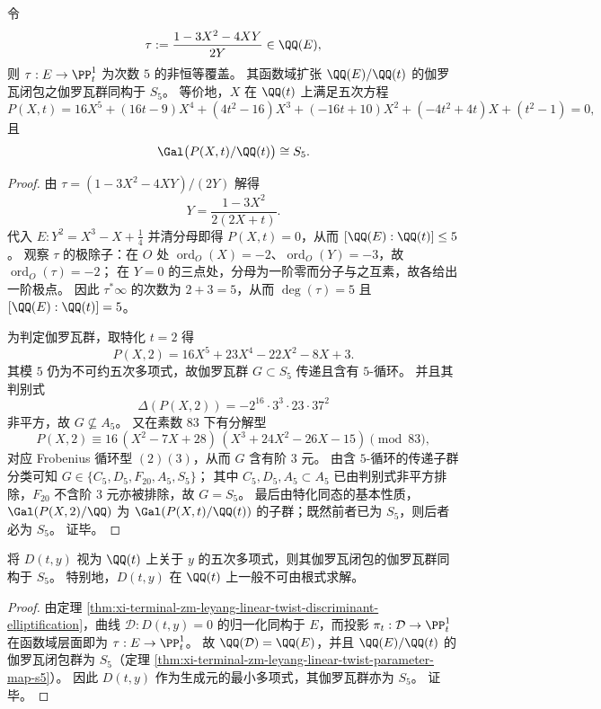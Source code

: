 \begin{theorem}[分歧参数映射的满对称单值化：\texorpdfstring{$\Gal\cong S_5$}{Gal = S5}]\label{thm:xi-terminal-zm-leyang-linear-twist-parameter-map-s5}
令
\[
\tau:=\frac{1-3X^2-4XY}{2Y}\in\QQ(E),
\]
则 \(\tau:E\to\PP^1_t\) 为次数 \(5\) 的非恒等覆盖。
其函数域扩张 \(\QQ(E)/\QQ(t)\) 的伽罗瓦闭包之伽罗瓦群同构于 \(S_5\)。
等价地，\(X\) 在 \(\QQ(t)\) 上满足五次方程
\[
P(X,t)=16X^5+(16t-9)X^4+(4t^2-16)X^3+(-16t+10)X^2+(-4t^2+4t)X+(t^2-1)=0,
\]
且
\[
\Gal\bigl(P(X,t)/\QQ(t)\bigr)\cong S_5.
\]
\end{theorem}
\begin{proof}
由 \(\tau=(1-3X^2-4XY)/(2Y)\) 解得
\[
Y=\frac{1-3X^2}{2(2X+t)}.
\]
代入 \(E:Y^2=X^3-X+\tfrac14\) 并清分母即得 \(P(X,t)=0\)，从而 \([\QQ(E):\QQ(t)]\le 5\)。
观察 \(\tau\) 的极除子：在 \(O\) 处 \(\operatorname{ord}_O(X)=-2\)、\(\operatorname{ord}_O(Y)=-3\)，故 \(\operatorname{ord}_O(\tau)=-2\)；
在 \(Y=0\) 的三点处，分母为一阶零而分子与之互素，故各给出一阶极点。
因此 \(\tau^*\infty\) 的次数为 \(2+3=5\)，从而 \(\deg(\tau)=5\) 且 \([\QQ(E):\QQ(t)]=5\)。
\par
为判定伽罗瓦群，取特化 \(t=2\) 得
\[
P(X,2)=16X^5+23X^4-22X^2-8X+3.
\]
其模 \(5\) 仍为不可约五次多项式，故伽罗瓦群 \(G\subset S_5\) 传递且含有 \(5\)-循环。
并且其判别式
\[
\Delta(P(X,2))=-2^{16}\cdot 3^3\cdot 23\cdot 37^2
\]
非平方，故 \(G\nsubseteq A_5\)。
又在素数 \(83\) 下有分解型
\[
P(X,2)\equiv 16\,(X^2-7X+28)\,(X^3+24X^2-26X-15)\pmod{83},
\]
对应 Frobenius 循环型 \((2)(3)\)，从而 \(G\) 含有阶 \(3\) 元。
由含 \(5\)-循环的传递子群分类可知 \(G\in\{C_5,D_5,F_{20},A_5,S_5\}\)；
其中 \(C_5,D_5,A_5\subset A_5\) 已由判别式非平方排除，\(F_{20}\) 不含阶 \(3\) 元亦被排除，故 \(G=S_5\)。
最后由特化同态的基本性质，\(\Gal(P(X,2)/\QQ)\) 为 \(\Gal(P(X,t)/\QQ(t))\) 的子群；既然前者已为 \(S_5\)，则后者必为 \(S_5\)。
证毕。
\end{proof}

\begin{corollary}[判别式五次核的不可解性]\label{cor:xi-terminal-zm-leyang-linear-twist-discriminant-quintic-unsolvable}
将 \(D(t,y)\) 视为 \(\QQ(t)\) 上关于 \(y\) 的五次多项式，则其伽罗瓦闭包的伽罗瓦群同构于 \(S_5\)。
特别地，\(D(t,y)\) 在 \(\QQ(t)\) 上一般不可由根式求解。
\end{corollary}
\begin{proof}
由定理 \ref{thm:xi-terminal-zm-leyang-linear-twist-discriminant-elliptification}，曲线 \(\mathcal D:D(t,y)=0\) 的归一化同构于 \(E\)，而投影 \(\pi_t:\mathcal D\to\PP^1_t\) 在函数域层面即为 \(\tau:E\to\PP^1_t\)。
故 \(\QQ(\mathcal D)=\QQ(E)\)，并且 \(\QQ(E)/\QQ(t)\) 的伽罗瓦闭包群为 \(S_5\)（定理 \ref{thm:xi-terminal-zm-leyang-linear-twist-parameter-map-s5}）。
因此 \(D(t,y)\) 作为生成元的最小多项式，其伽罗瓦群亦为 \(S_5\)。
证毕。
\end{proof}

